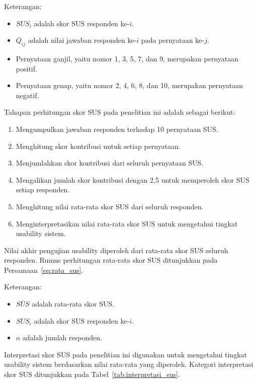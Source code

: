Keterangan:
\begin{itemize}
    \item $SUS_i$ adalah skor SUS responden ke-$i$.
    \item $Q_{ij}$ adalah nilai jawaban responden ke-$i$ pada pernyataan ke-$j$.
    \item Pernyataan ganjil, yaitu nomor 1, 3, 5, 7, dan 9, merupakan pernyataan positif.
    \item Pernyataan genap, yaitu nomor 2, 4, 6, 8, dan 10, merupakan pernyataan negatif.
\end{itemize}

Tahapan perhitungan skor SUS pada penelitian ini adalah sebagai berikut:
\begin{enumerate}
    \item Mengumpulkan jawaban responden terhadap 10 pernyataan SUS.
    \item Menghitung skor kontribusi untuk setiap pernyataan.
    \item Menjumlahkan skor kontribusi dari seluruh pernyataan SUS.
    \item Mengalikan jumlah skor kontribusi dengan 2,5 untuk memperoleh skor SUS setiap responden.
    \item Menghitung nilai rata-rata skor SUS dari seluruh responden.
    \item Menginterpretasikan nilai rata-rata skor SUS untuk mengetahui tingkat usability sistem.
\end{enumerate}

Nilai akhir pengujian usability diperoleh dari rata-rata skor SUS seluruh responden. Rumus perhitungan rata-rata skor SUS ditunjukkan pada Persamaan~\ref{eq:rata_sus}.


Keterangan:
\begin{itemize}
    \item $\overline{SUS}$ adalah rata-rata skor SUS.
    \item $SUS_i$ adalah skor SUS responden ke-$i$.
    \item $n$ adalah jumlah responden.
\end{itemize}

Interpretasi skor SUS pada penelitian ini digunakan untuk mengetahui tingkat usability sistem berdasarkan nilai rata-rata yang diperoleh. Kategori interpretasi skor SUS ditunjukkan pada Tabel~\ref{tab:interpretasi_sus}.

